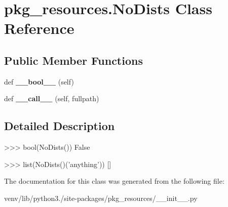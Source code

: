 \hypertarget{classpkg__resources_1_1_no_dists}{}\section{pkg\+\_\+resources.\+No\+Dists Class Reference}
\label{classpkg__resources_1_1_no_dists}
\subsection*{Public Member Functions}
\begin{DoxyCompactItemize}
\item 
\mbox{\label{classpkg__resources_1_1_no_dists_ac23036682fc6952bfcd4ab3e238a1e9b}} 
def {\bfseries \+\_\+\+\_\+bool\+\_\+\+\_\+} (self)
\item 
\mbox{\label{classpkg__resources_1_1_no_dists_a58f3f227544be750eae7ffa18dc683f6}} 
def {\bfseries \+\_\+\+\_\+call\+\_\+\+\_\+} (self, fullpath)
\end{DoxyCompactItemize}


\subsection{Detailed Description}
\begin{DoxyVerb}>>> bool(NoDists())
False

>>> list(NoDists()('anything'))
[]
\end{DoxyVerb}
 

The documentation for this class was generated from the following file\+:\begin{DoxyCompactItemize}
\item 
venv/lib/python3./site-\/packages/pkg\+\_\+resources/\+\_\+\+\_\+init\+\_\+\+\_\+.\+py\end{DoxyCompactItemize}
